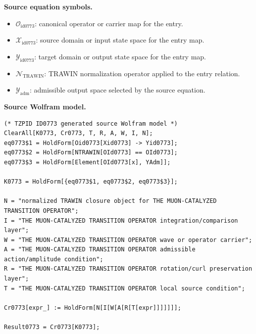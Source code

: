 \begin{minipage}[t]{0.49\linewidth}
\begingroup
\small
\raggedright
\textbf{Source equation symbols.}\par
\begin{itemize}[leftmargin=1.35em,itemsep=1pt,topsep=1pt,parsep=0pt]
    \item $\mathcal{O}_{\mathrm{id0773}}$: canonical operator or carrier map for the entry.
    \item $\mathcal{X}_{\mathrm{id0773}}$: source domain or input state space for the entry map.
    \item $\mathcal{Y}_{\mathrm{id0773}}$: target domain or output state space for the entry map.
    \item $\mathcal{N}_{\mathrm{TRAWIN}}$: TRAWIN normalization operator applied to the entry relation.
    \item $\mathcal{Y}_{\mathrm{adm}}$: admissible output space selected by the source equation.
\end{itemize}
\endgroup
\end{minipage}\hfill
\begin{minipage}[t]{0.47\linewidth}
\begingroup
\scriptsize
\raggedright
\textbf{Source Wolfram model.}\par
\begin{Verbatim}[fontsize=\tiny,breaklines=true,breakanywhere=true]
(* TZPID ID0773 generated source Wolfram model *)
ClearAll[K0773, Cr0773, T, R, A, W, I, N];
eq0773$1 = HoldForm[Oid0773[Xid0773] -> Yid0773];
eq0773$2 = HoldForm[NTRAWIN[OId0773] == OId0773];
eq0773$3 = HoldForm[Element[OId0773[x], YAdm]];

K0773 = HoldForm[{eq0773$1, eq0773$2, eq0773$3}];

N = "normalized TRAWIN closure object for THE MUON-CATALYZED TRANSITION OPERATOR";
I = "THE MUON-CATALYZED TRANSITION OPERATOR integration/comparison layer";
W = "THE MUON-CATALYZED TRANSITION OPERATOR wave or operator carrier";
A = "THE MUON-CATALYZED TRANSITION OPERATOR admissible action/amplitude condition";
R = "THE MUON-CATALYZED TRANSITION OPERATOR rotation/curl preservation layer";
T = "THE MUON-CATALYZED TRANSITION OPERATOR local source condition";

Cr0773[expr_] := HoldForm[N[I[W[A[R[T[expr]]]]]]];

Result0773 = Cr0773[K0773];
\end{Verbatim}
\endgroup
\end{minipage}

